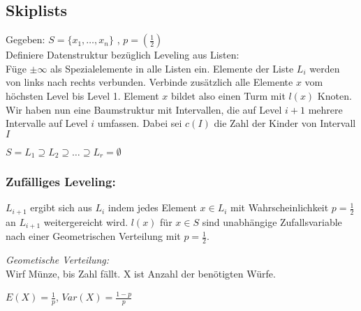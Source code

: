         \subsection{Skiplists} 
            Gegeben: $S = \{ x_1, \ldots, x_n \}$ , $p=(\frac{1}{2})$ \\            
            Definiere Datenstruktur bezüglich Leveling aus Listen: \\
            Füge $\pm \infty$ als Spezialelemente in alle Listen ein. Elemente der Liste $L_i$ werden von links nach rechts verbunden. Verbinde zusätzlich alle Elemente $x$ vom höchsten Level bis Level 1. Element $x$ bildet also einen Turm mit $l(x)$ Knoten. Wir haben nun eine Baumstruktur mit Intervallen, die auf Level $i+1$ mehrere Intervalle auf Level $i$ umfassen. Dabei sei $c(I)$ die Zahl der Kinder von Intervall $I$           
            
            $S= L_1 \supseteq L_2 \supseteq \ldots \supseteq L_r=\emptyset$
            
            \subsubsection{Zufälliges Leveling:}
            
            
            
            $L_{i+1}$ ergibt sich aus $L_i$ indem jedes Element $x\in L_i$ mit Wahrscheinlichkeit $p=\frac{1}{2}$ an $L_{i+1}$ weitergereicht wird.
            $l(x)$ für $x\in S$ sind unabhängige Zufallsvariable nach einer Geometrischen Verteilung mit $p=\frac{1}{2}$.
            
            \emph{Geometische Verteilung:}\\
            Wirf Münze, bis Zahl fällt. X ist Anzahl der benötigten Würfe.
            
            $E(X)=\frac{1}{p}$, $Var(X)=\frac{1-p}{p}$\\\\
            
